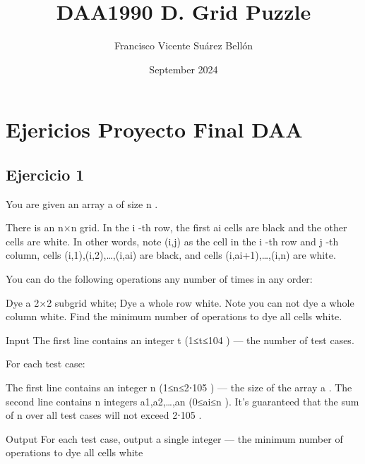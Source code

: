 \documentclass{article}
\title{DAA}
\author{Francisco Vicente Suárez Bellón}
\date{September 2024}
\begin{document}
\maketitle

\section{Ejericios Proyecto Final DAA}

\subsection{Ejercicio 1}
\title{1990 D. Grid Puzzle }
You are given an array a
 of size n
.

There is an n×n
 grid. In the i
-th row, the first ai
 cells are black and the other cells are white. In other words, note (i,j)
 as the cell in the i
-th row and j
-th column, cells (i,1),(i,2),…,(i,ai)
 are black, and cells (i,ai+1),…,(i,n)
 are white.

You can do the following operations any number of times in any order:

Dye a 2×2
 subgrid white;
Dye a whole row white. Note you can not dye a whole column white.
Find the minimum number of operations to dye all cells white.

Input
The first line contains an integer t
 (1≤t≤104
) — the number of test cases.

For each test case:

The first line contains an integer n
 (1≤n≤2⋅105
) — the size of the array a
.
The second line contains n
 integers a1,a2,…,an
 (0≤ai≤n
).
It's guaranteed that the sum of n
 over all test cases will not exceed 2⋅105
.

Output
For each test case, output a single integer — the minimum number of operations to dye all cells white
\end{document}
